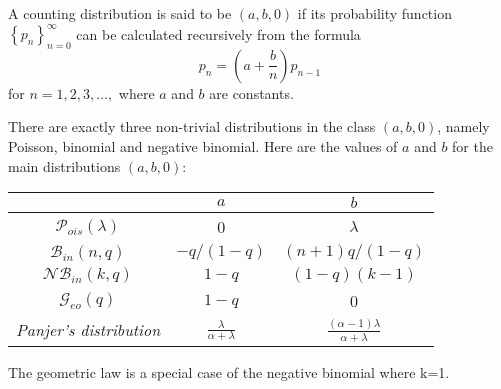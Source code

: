 \begin{f}
	
	A counting distribution is said to be \((a, b, 0)\) if its probability function \(\left\{p_{n}\right\}_{n=0}^{\infty}\) can be calculated recursively from the formula
	\[
	p_{n}=\left(a+\frac{b}{n}\right) p_{n-1}
	\]
	for \(n=1,2,3, \ldots,\) where \(a\) and \(b\) are constants.
	
	There are exactly three non-trivial distributions in the class \((a, b, 0)\), namely Poisson, binomial and negative binomial. Here are the values of \(a\) and \(b\) for the main distributions \((a, b, 0)\):
	\begin{center}
		\begin{tabular}{ccc} 
			& \(a\) & \(b\) \\
			\hline\(\mathcal{P}_{ois}(\lambda)\) & 0 & \(\lambda\) \\
			\(\mathcal{B}_{in}(n, q)\) & \(-q /(1-q)\) & \((n+1) q /(1-q)\) \\
			\(\mathcal{N}\mathcal{B}_{in}(k, q)\) & \(1-q\) & \((1-q)(k-1)\) \\
			\(\mathcal{G}_{eo}( q)\) & \(1-q\) & 0 \\
			\textit{    Panjer's distribution} & \(\frac{\lambda}{\alpha+\lambda}\) &    \(\frac {(\alpha -1)\lambda }{\alpha +\lambda }\) \\
			\hline 
		\end{tabular}
		
	\end{center}
	
	{\footnotesize\color{OrangeProfondIRA} The geometric law is a special case of the negative binomial where k=1.}
\end{f}

